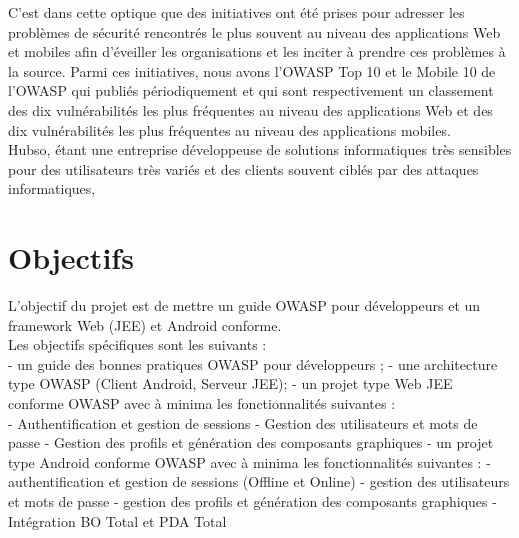 C’est dans cette optique que des initiatives ont été prises pour adresser les problèmes de sécurité rencontrés le plus souvent au niveau des applications Web et mobiles afin d’éveiller les organisations et les inciter à prendre ces problèmes à la source. Parmi ces initiatives, nous avons l’OWASP Top 10 et le Mobile 10 de l’OWASP qui publiés périodiquement et qui sont respectivement un classement des dix vulnérabilités les plus fréquentes au niveau des applications Web et des dix vulnérabilités les plus fréquentes au niveau des applications mobiles.\\
Hubso, étant une entreprise développeuse de solutions informatiques très sensibles pour des utilisateurs très variés et des clients souvent ciblés par des attaques informatiques, 

\section{Objectifs}
L’objectif du projet est de mettre un guide OWASP pour développeurs et un framework Web (JEE) et Android conforme.\\
Les objectifs spécifiques sont les suivants :\\
- un guide des bonnes pratiques OWASP pour développeurs ;
- une architecture type OWASP (Client Android, Serveur JEE);
- un projet type Web JEE conforme OWASP avec à minima les fonctionnalités suivantes : \\
	- Authentification et gestion de sessions
	- Gestion des utilisateurs et mots de passe
	- Gestion des profils et génération des composants graphiques
- un projet type Android conforme OWASP avec à minima les fonctionnalités suivantes :
	- authentification et gestion de sessions (Offline et Online)
	- gestion des utilisateurs et mots de passe
	- gestion des profils et génération des composants graphiques
- Intégration BO Total et PDA Total


\clearpage 
